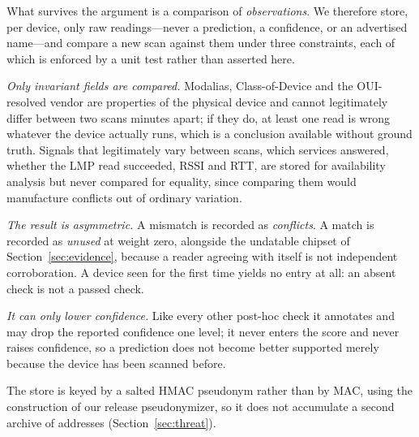 \documentclass[conference]{IEEEtran}
\begin{document}
What survives the argument is a comparison of \emph{observations}. We
therefore store, per device, only raw readings---never a prediction, a
confidence, or an advertised name---and compare a new scan against them under
three constraints, each of which is enforced by a unit test rather than
asserted here.

\emph{Only invariant fields are compared.} Modalias, Class-of-Device and the
OUI-resolved vendor are properties of the physical device and cannot
legitimately differ between two scans minutes apart; if they do, at least one
read is wrong whatever the device actually runs, which is a conclusion
available without ground truth. Signals that legitimately vary between scans,
which services answered, whether the LMP read succeeded, RSSI and RTT, are
stored for availability analysis but never compared for equality, since
comparing them would manufacture conflicts out of ordinary variation.

\emph{The result is asymmetric.} A mismatch is recorded as \emph{conflicts}. A
match is recorded as \emph{unused} at weight zero, alongside the undatable
chipset of Section~\ref{sec:evidence}, because a reader agreeing with itself
is not independent corroboration. A device seen for the first time yields no
entry at all: an absent check is not a passed check.

\emph{It can only lower confidence.} Like every other post-hoc check it
annotates and may drop the reported confidence one level; it never enters the
score and never raises confidence, so a prediction does not become better
supported merely because the device has been scanned before.

The store is keyed by a salted HMAC pseudonym rather than by MAC, using the
construction of our release pseudonymizer, so it does not accumulate a second
archive of addresses (Section~\ref{sec:threat}).
\end{document}
